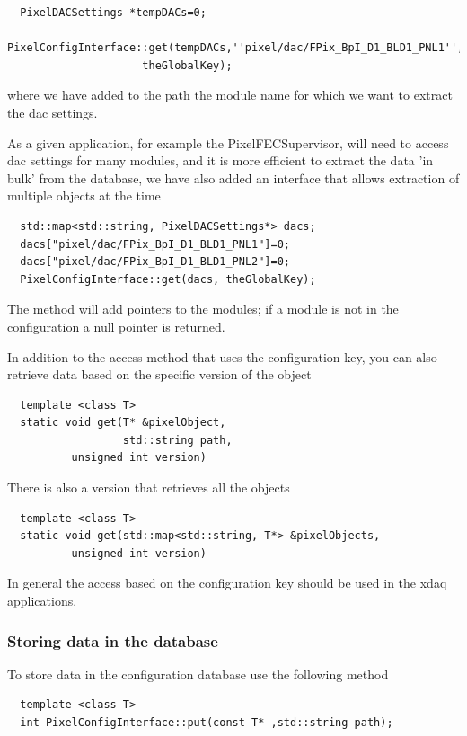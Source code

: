 \begin{verbatim}
  PixelDACSettings *tempDACs=0;
  PixelConfigInterface::get(tempDACs,''pixel/dac/FPix_BpI_D1_BLD1_PNL1'', 
                     theGlobalKey);
\end{verbatim}

where we have added to the path the module name for which we want to 
extract the
dac settings.

As a given application, for example the PixelFECSupervisor, will need to access
dac settings for many modules, and it is more efficient to extract
the data 'in bulk' from the database, we have also added an interface
that allows extraction of multiple objects at the time

\begin{verbatim}
  std::map<std::string, PixelDACSettings*> dacs;
  dacs["pixel/dac/FPix_BpI_D1_BLD1_PNL1"]=0;
  dacs["pixel/dac/FPix_BpI_D1_BLD1_PNL2"]=0;
  PixelConfigInterface::get(dacs, theGlobalKey);
\end{verbatim}

The method will add pointers to the modules; if a module is not
in the configuration a null pointer is returned.

In addition to the access method that uses the configuration key,
you can also retrieve data based on the specific version of the
object
\begin{verbatim}
  template <class T>
  static void get(T* &pixelObject,
                  std::string path,
		  unsigned int version)
\end{verbatim}
There is also a version that retrieves all the objects
\begin{verbatim}
  template <class T>
  static void get(std::map<std::string, T*> &pixelObjects,
		  unsigned int version)
\end{verbatim}
In general the access based on the configuration key should be used
in the xdaq applications.


\subsubsection{Storing data in the database}

To store data in the configuration database use the following 
method

\begin{verbatim}
  template <class T>
  int PixelConfigInterface::put(const T* ,std::string path);
\end{verbatim}

